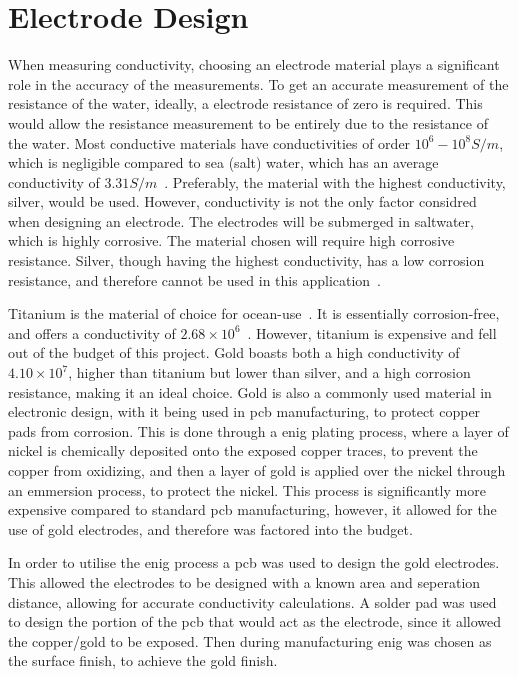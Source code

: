 \section{Electrode Design}
When measuring conductivity, choosing an electrode material plays a significant role in the accuracy of the measurements.
To get an accurate measurement of the resistance of the water, ideally, a electrode resistance of zero is required.
This would allow the resistance measurement to be entirely due to the resistance of the water.
Most conductive materials have conductivities of order $10^6 - 10^8 S/m$, which is negligible compared to sea (salt) water, which has an average conductivity of $3.31 S/m$~\cite{conductivities}\cite{ocean_conductivity_tyler}.
Preferably, the material with the highest conductivity, silver, would be used. However, conductivity is not the only factor considred when designing an electrode. 
The electrodes will be submerged in saltwater, which is highly corrosive. The material chosen will require high corrosive resistance. 
Silver, though having the highest conductivity, has a low corrosion resistance, and therefore cannot be used in this application~\cite{zhang_silver}.

Titanium is the material of choice for ocean-use~\cite{materials_ocean_structures}. It is essentially corrosion-free, and offers a conductivity of $2.68\times 10^{6}$~\cite{conductivities}.
However, titanium is expensive and fell out of the budget of this project.
Gold boasts both a high conductivity of $4.10\times 10^{7}$, higher than titanium but lower than silver, and a high corrosion resistance, making it an ideal choice.
Gold is also a commonly used material in electronic design, with it being used in \gls{pcb} manufacturing, to protect copper pads from corrosion.
This is done through a \gls{enig} plating process, where a layer of nickel is chemically deposited onto the exposed copper traces, to prevent the copper from oxidizing, and then a layer of gold is applied over the nickel through an emmersion process, to protect the nickel.
This process is significantly more expensive compared to standard \gls{pcb} manufacturing, however, it allowed for the use of gold electrodes, and therefore was factored into the budget. 

In order to utilise the \gls{enig} process a \gls{pcb} was used to design the gold electrodes.
This allowed the electrodes to be designed with a known area and seperation distance, allowing for accurate conductivity calculations.
A solder pad was used to design the portion of the \gls{pcb} that would act as the electrode, since it allowed the copper/gold to be exposed.
Then during manufacturing \gls{enig} was chosen as the surface finish, to achieve the gold finish.

